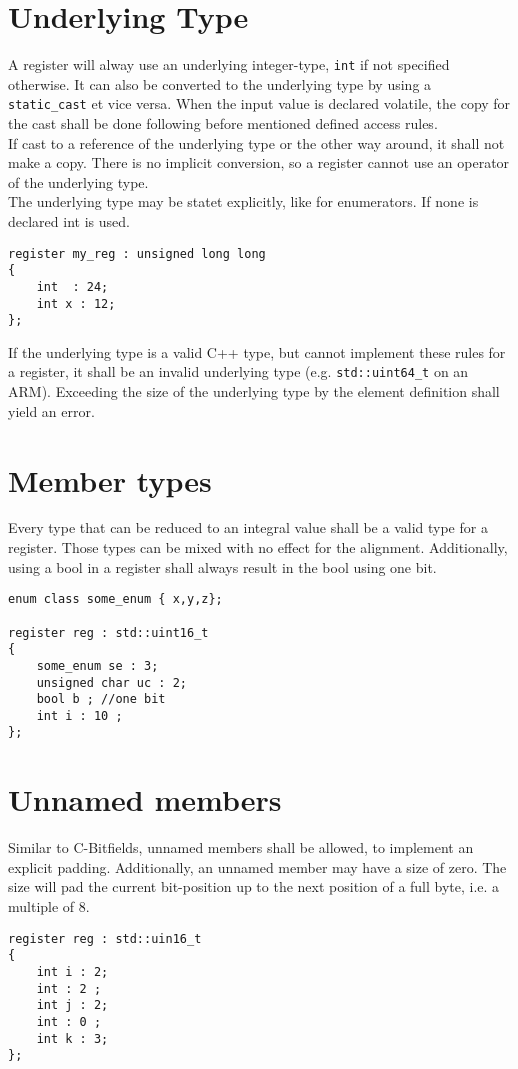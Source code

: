 \documentclass{report}
\begin{document}
\section{Underlying Type}
A register will alway use an underlying integer-type, \lstinline {int} if not specified otherwise. It can also be converted to the underlying type by using a \lstinline {static_cast} et vice versa. When the input value is declared volatile, the copy for the cast shall be done following before mentioned defined access rules.\\
If cast to a reference of the underlying type or the other way around, it shall not make a copy. There is no implicit conversion, so a register cannot use an operator of the underlying type.\\
The underlying type may be statet explicitly, like for enumerators.
If none is declared int is used.
\begin{lstlisting}
register my_reg : unsigned long long
{
	int  : 24;
	int x : 12;
};
\end{lstlisting}
If the underlying type is a valid C++ type, but cannot implement these rules for a register, it shall be an invalid underlying type (e.g. \lstinline {std::uint64_t} on an ARM).
Exceeding the size of the underlying type by the element definition shall yield an error.\\


\section{Member types}
Every type that can be reduced to an integral value shall be a valid type for a register. Those types can be mixed with no effect for the alignment. 
Additionally, using a bool in a register shall always result in the bool using one bit. 

\begin{lstlisting}[label=lst:cplx]
enum class some_enum { x,y,z};

register reg : std::uint16_t
{
	some_enum se : 3;
	unsigned char uc : 2;
	bool b ; //one bit
	int i : 10 ;	
};
\end{lstlisting}

\section{Unnamed members}
Similar to C-Bitfields, unnamed members shall be allowed, to implement an explicit padding.
Additionally, an unnamed member may have a size of zero. The size will pad the
current bit-position up to the next position of a full byte, i.e. a multiple of
8.
\begin{lstlisting}
register reg : std::uin16_t
{
	int i : 2;
	int : 2 ;
	int j : 2;
	int : 0 ;
	int k : 3;
};
\end{lstlisting}
\end{document}
